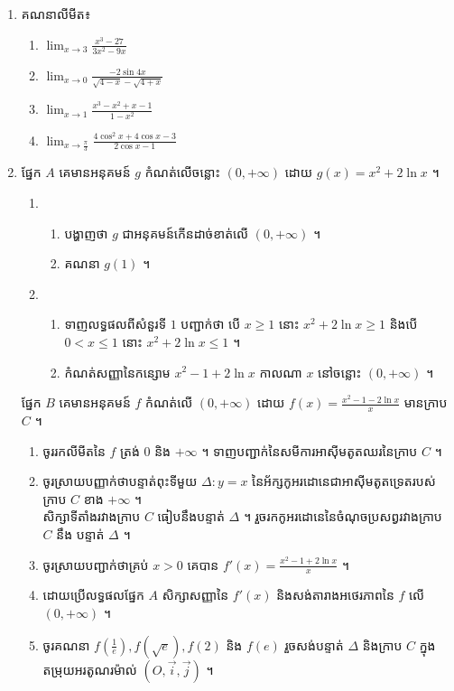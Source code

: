 \documentclass{officialexam}
\begin{document}
\begin{enumerate}[I]
	\item គណនាលីមីត៖ 
	\begin{enumerate}[k,4]
		\item $\lim_{x\to3}\frac{x^3-27}{3x^2-9x}$
		\item $\lim_{x\to0}\frac{-2\sin4x}{\sqrt{4-x}-\sqrt{4+x}}$
		\item $\lim_{x\to1}\frac{x^3-x^2+x-1}{1-x^2}$
		\item $\lim_{x\to\frac{\pi}{3}}\frac{4\cos^2x+4\cos x-3}{2\cos x-1}$
	\end{enumerate}
	\item {\color{khtug} \sffamily ផ្នែក $A$} គេមានអនុគមន៍ $g$ កំណត់លើចន្លោះ $(0, +\infty)$ ដោយ $g(x)=x^2+2\ln x$ ។
	\begin{enumerate}[1]
		\item \begin{enumerate}[k]
			\item បង្ហាញថា $g$ ជាអនុគមន៍កើនដាច់ខាត់លើ $(0, +\infty)$ ។
			\item គណនា $g(1)$ ។
		\end{enumerate}
		\item \begin{enumerate}[k]
			\item ទាញលទ្ធផលពីសំនួរទី $1$ បញ្ជាក់ថា បើ $x\geq1$ នោះ $x^2+2\ln x\geq1$ និងបើ $0<x\leq1$ នោះ $x^2+2\ln x\leq1$ ។ 
			\item កំណត់សញ្ញានៃកន្សោម $x^2-1+2\ln x$ កាលណា $x$ នៅចន្លោះ $(0,+\infty)$ ។
		\end{enumerate}
	\end{enumerate}
	{\color{khtug} \sffamily ផ្នែក $B$} គេមានអនុគមន៍ $f$ កំណត់លើ $(0,+\infty)$ ដោយ $f(x)=\frac{x^2-1-2\ln x}{x}$ មានក្រាប $C$ ។
	\begin{enumerate}[k]
		\item ចូររកលីមីតនៃ $f$ ត្រង់ $0$ និង $+\infty$ ។ ទាញបញ្ជាក់នៃសមីការអាស៊ីមតូតឈរនៃក្រាប $C$ ។
		\item ចូរស្រាយបញ្ញាក់ថាបន្ទាត់ពុះទីមួយ $\Delta : y=x$ នៃអ័ក្សកូអរដោនេជាអាស៊ីមតូតទ្រេតរបស់ក្រាប $C$ ខាង $+\infty$ ។ \\សិក្សាទីតាំងរវាងក្រាប $C$ ធៀបនឹងបន្ទាត់ $\Delta$ ។ រួចរកកូអរដោនេនៃចំណុចប្រសព្វរវាងក្រាប $C$ នឹង បន្ទាត់ $\Delta$ ។
		\item ចូរស្រាយបញ្ជាក់ថាគ្រប់ $x>0$ គេបាន $f'(x)=\frac{x^2-1+2\ln x}{x}$ ។
		\item ដោយប្រើលទ្ធផលផ្នែក $A$ សិក្សាសញ្ញានៃ $f'(x)$ និងសង់តារាងអថេរភាពនៃ $f$ លើ $(0, +\infty)$ ។
		\item ចូរគណនា $f\left(\frac{1}{e}\right), f\left(\sqrt{e}\right), f(2)$ និង $f(e)$ រួចសង់បន្ទាត់ $\Delta$ និងក្រាប $C$ ក្នុងតម្រុយអរតូណរម៉ាល់ $(O, \vec{i}, \vec{j})$ ។\\

\end{enumerate}
\end{enumerate}
\end{document}

